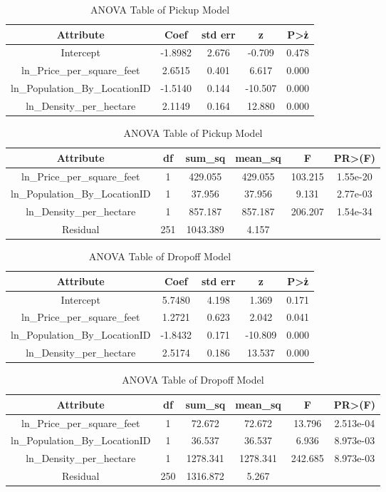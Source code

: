 \documentclass[11pt]{article}
\begin{document}
\begin{table}
\centering
\begin{tabular}{||c c c c c||}
 \hline
 Attribute & Coef & std err & z & P\textgreater\|z\| \\ [0.5ex]
 \hline\hline
 Intercept & -1.8982 & 2.676 & -0.709 & 0.478 \\ 
 \hline
 ln\_Price\_per\_square\_feet & 2.6515 & 0.401 & 6.617 & 0.000\\
 \hline
 ln\_Population\_By\_LocationID & -1.5140 & 0.144 & -10.507 & 0.000\\
 \hline
ln\_Density\_per\_hectare & 2.1149 & 0.164 & 12.880 & 0.000\\
 \hline
\end{tabular}
  \caption{Coefficient of Pickup Model}
  \label{tab:pickup}
\begin{tabular}{||c c c c c c||}
 \hline
 Attribute & df & sum\_sq & mean\_sq & F & PR\textgreater(F) \\ [0.5ex]
 \hline\hline
 ln\_Price\_per\_square\_feet & 1 & 429.055 & 429.055 & 103.215 & 1.55e-20\\
 \hline
 ln\_Population\_By\_LocationID & 1 & 37.956 & 37.956 & 9.131 & 2.77e-03\\
 \hline
ln\_Density\_per\_hectare & 1 & 857.187 & 857.187 & 206.207 & 1.54e-34\\
 \hline
 Residual & 251 & 1043.389 & 4.157 & & \\ 
 \hline
\end{tabular}
  \caption{ANOVA Table of Pickup Model}
  \label{tab:pickupanova}
\end{table}
\begin{table}
\centering
\begin{tabular}{||c c c c c||}
 \hline
 Attribute & Coef & std err & z & P\textgreater\|z\| \\ [0.5ex]
 \hline\hline
 Intercept & 5.7480 & 4.198 & 1.369 & 0.171 \\ 
 \hline
 ln\_Price\_per\_square\_feet & 1.2721 & 0.623 & 2.042 & 0.041\\
 \hline
 ln\_Population\_By\_LocationID & -1.8432 & 0.171 & -10.809 & 0.000\\
 \hline
ln\_Density\_per\_hectare & 2.5174 & 0.186 & 13.537 & 0.000\\
 \hline
\end{tabular}
  \caption{Coefficient of Dropoff Model}
  \label{tab:dropoff}
\begin{tabular}{||c c c c c c||}
 \hline
 Attribute & df & sum\_sq & mean\_sq & F & PR\textgreater(F) \\ [0.5ex]
 \hline\hline
 ln\_Price\_per\_square\_feet & 1 & 72.672 & 72.672 & 13.796 & 2.513e-04\\
 \hline
 ln\_Population\_By\_LocationID & 1 & 36.537 & 36.537 & 6.936 & 8.973e-03\\
 \hline
ln\_Density\_per\_hectare & 1 & 1278.341 & 1278.341 & 242.685 & 8.973e-03\\
 \hline
 Residual & 250 & 1316.872 & 5.267 & & \\ 
 \hline
\end{tabular}
  \caption{ANOVA Table of Dropoff Model}
  \label{tab:dropoffanova}
\end{table}

\clearpage

\printbibliography
\end{document}
